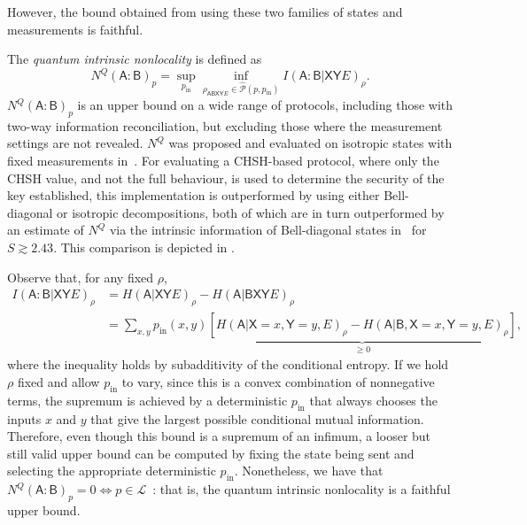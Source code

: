 \documentclass[10pt, a4paper]{article}
\numberwithin{equation}{section} %
\theoremstyle{definition}
\theoremstyle{plain}
\newcommand{\?}{\mathrel{?}} %
\newcommand{\crv}[1]{\mathsf{#1}}
\newcommand{\Ls}{\mathcal{L}}
\newcommand{\compatstates}[3][]{\hat{\mathcal{P}}#1(#2,#3)}
\newcommand{\prin}[1][p]{#1_{\mathrm{in}}}
\begin{document}
    However, the bound obtained from  using these two families of states and measurements is faithful.

    The \emph{quantum intrinsic nonlocality} is defined as~\cite{DIQKD_Limits}
    \begin{equation}
      N^Q{(\crv{A}:\crv{B})}_p = \sup_{\prin} \inf_{\rho_{\crv{ABXY}E}\in\compatstates{p}{\prin}} I{(\crv{A}:\crv{B}|\crv{XY}E)}_{\rho}.
    \end{equation}
    \(N^Q{(\crv{A}:\crv{B})}_p\) is an upper bound on a wide range of protocols, including those with two-way information reconciliation, but excluding those where the measurement settings are not revealed. \(N^Q\) was proposed and evaluated on isotropic states with fixed measurements in~\cite{DIQKD_Limits}. For evaluating a CHSH-based protocol, where only the CHSH value, and not the full behaviour, is used to determine the security of the key established, this implementation is outperformed by  using either Bell-diagonal or isotropic decompositions, both of which are in turn outperformed by an estimate of \(N^Q\) via the intrinsic information of Bell-diagonal states in~\cite[Appendix B]{RevisedPeres} for \(S \gtrsim 2.43\). This comparison is depicted in .

    Observe that, for any fixed \(\rho\),
    \begin{align}
      I{(\crv{A}:\crv{B}|\crv{XY}E)}_{\rho} &= H{(\crv{A}|\crv{XY}E)}_{\rho} - H{(\crv{A}|\crv{BXY}E)}_{\rho} \\
                                            &= \sum_{x,y} \prin(x,y) \underbrace{\left[ H{(\crv{A}|\crv{X}=x,\crv{Y}=y,E)}_{\rho} - H{(\crv{A}|\crv{B},\crv{X}=x,\crv{Y}=y,E)}_{\rho} \right]}_{\geq 0},
    \end{align}
    where the inequality holds by subadditivity of the conditional entropy. If we hold \(\rho\) fixed and allow \(\prin\) to vary, since this is a convex combination of nonnegative terms, the supremum is achieved by a deterministic \(\prin\) that always chooses the inputs \(x\) and \(y\) that give the largest possible conditional mutual information. Therefore, even though this bound is a supremum of an infimum, a looser but still valid upper bound can be computed by fixing the state being sent and selecting the appropriate deterministic \(\prin\). Nonetheless, we have that \(N^Q{(\crv{A}:\crv{B})}_p = 0 \Leftrightarrow p \in \Ls\)~\cite[Thm 20]{DIQKD_Limits}: that is, the quantum intrinsic nonlocality is a faithful upper bound.
\end{document}
